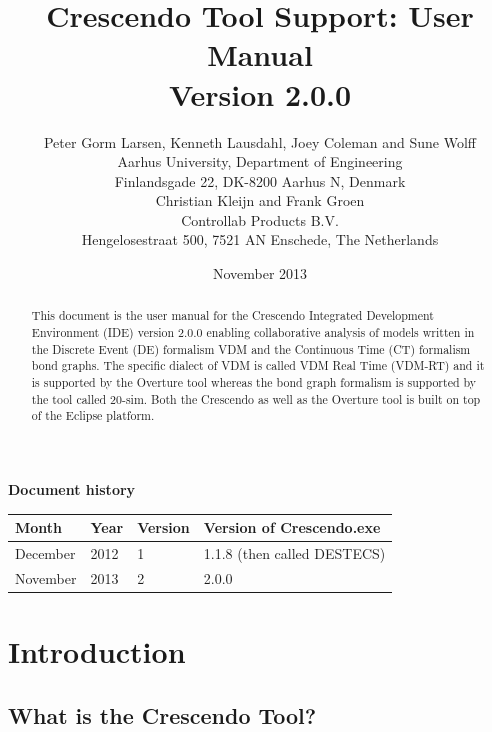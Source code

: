 \documentclass{crescendorepchap}
\begin{document}
\title{Crescendo Tool Support: User Manual \\{\large Version 2.0.0}}
\author{Peter Gorm Larsen, Kenneth Lausdahl, Joey Coleman and Sune Wolff \\
Aarhus University, Department of Engineering\\
Finlandsgade 22, DK-8200 Aarhus N, Denmark\\[5mm]
Christian Kleijn and Frank Groen\\
Controllab Products B.V.\\
Hengelosestraat 500, 7521 AN Enschede, The Netherlands
}

\date{November 2013}


\maketitle


\textbf{Document history}

\begin{tabular}{|l|l|l|l|}\hline
Month   & Year & Version & Version of Crescendo.exe \\ \hline
December& 2012 & 1       & 1.1.8 (then called DESTECS)  \\ \hline
November& 2013 & 2       & 2.0.0 \\ \hline
\end{tabular}

\tableofcontents

\begin{abstract}
This document is the user manual for the Crescendo Integrated
Development Environment (IDE) version 2.0.0 enabling collaborative
analysis of models written in the Discrete Event (DE) formalism VDM
and the Continuous Time (CT) formalism bond graphs. The specific
dialect of VDM is called VDM Real Time (VDM-RT) and it is supported by
the Overture tool whereas the bond graph formalism is supported by the
tool called 20-sim.  Both the Crescendo as well as the Overture tool
is built on top of the Eclipse platform.
\end{abstract}

\chapter{Introduction}

\section{What is the Crescendo Tool?}\label{sec:crescendointro}
\end{document}
